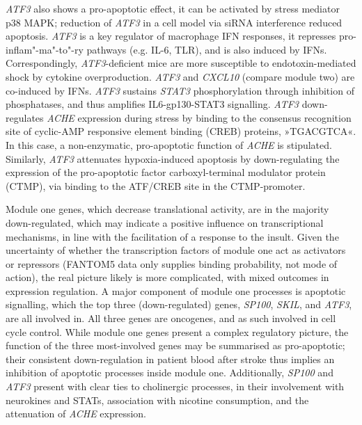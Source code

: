 \emph{ATF3} also shows a pro-apoptotic effect, it can be activated by stress mediator p38 MAPK;\cite{Song2016} reduction of \emph{ATF3} in a cell model via siRNA interference reduced apoptosis.\cite{Sun2017} \emph{ATF3} is a key regulator of macrophage IFN responses, it represses pro-inflam"-ma"-to"-ry pathways (e.g. IL-6, TLR), and is also induced by IFNs. Correspondingly, \emph{ATF3}-deficient mice are more susceptible to endotoxin-mediated shock by cytokine overproduction. \emph{ATF3} and \emph{CXCL10} (compare module two) are co-induced by IFNs.\cite{Labzin2015} \emph{ATF3} sustains \emph{STAT3} phosphorylation through inhibition of phosphatases, and thus amplifies IL6-gp130-STAT3 signalling.\cite{Glal2018} \emph{ATF3} down-regulates \emph{ACHE} expression during stress by binding to the consensus recognition site of cyclic-AMP responsive element binding (CREB) proteins, »TGACGTCA«. In this case, a non-enzymatic, pro-apoptotic function of \emph{ACHE} is stipulated.\cite{Heinrich2018} Similarly, \emph{ATF3} attenuates hypoxia-induced apoptosis by down-regulating the expression of the pro-apoptotic factor carboxyl-terminal modulator protein (CTMP), via binding to the ATF/CREB site in the CTMP-promoter.\cite{Huang2015}

Module one genes, which decrease translational activity, are in the majority down-regulated, which may indicate a positive influence on transcriptional mechanisms, in line with the facilitation of a response to the insult. Given the uncertainty of whether the transcription factors of module one act as activators or repressors (FANTOM5 data only supplies binding probability, not mode of action), the real picture likely is more complicated, with mixed outcomes in expression regulation. A major component of module one processes is apoptotic signalling, which the top three (down-regulated) genes, \emph{SP100}, \emph{SKIL}, and \emph{ATF3}, are all involved in. All three genes are oncogenes, and as such involved in cell cycle control. While module one genes present a complex regulatory picture, the function of the three most-involved genes may be summarised as pro-apoptotic; their consistent down-regulation in patient blood after stroke thus implies an inhibition of apoptotic processes inside module one. Additionally, \emph{SP100} and \emph{ATF3} present with clear ties to cholinergic processes, in their involvement with neurokines and STATs, association with nicotine consumption, and the attenuation of \emph{ACHE} expression. 


